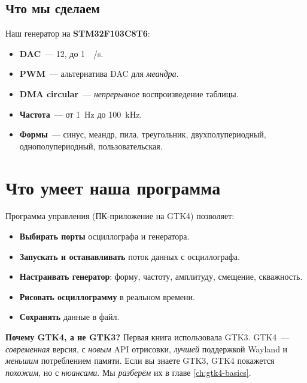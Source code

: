 \subsection{Что мы сделаем}

Наш генератор на \textbf{STM32F103C8T6}:

\begin{itemize}
    \item \textbf{DAC}~--- \SI{12}{\bit}, до \SI{1}{\mega\sample/\second}.
    \item \textbf{PWM}~--- альтернатива DAC для \emph{меандра}.
    \item \textbf{DMA circular}~--- \emph{непрерывное}
          воспроизведение таблицы.
    \item \textbf{Частота}~--- от \SI{1}{\hertz} до \SI{100}{\kilo\hertz}.
    \item \textbf{Формы}~--- синус, меандр, пила, треугольник,
          двухполупериодный, однополупериодный, пользовательская.
\end{itemize}

\section{Что умеет наша программа}
\label{sec:intro-capabilities}

Программа управления (ПК-приложение на GTK4) позволяет:

\begin{itemize}
    \item \textbf{Выбирать порты} осциллографа и генератора.
    \item \textbf{Запускать и останавливать} поток данных
          с осциллографа.
    \item \textbf{Настраивать генератор}: форму, частоту,
          амплитуду, смещение, скважность.
    \item \textbf{Рисовать осциллограмму} в реальном времени.
    \item \textbf{Сохранять} данные в файл.
\end{itemize}

\begin{ideabox}
\textbf{Почему GTK4, а не GTK3?} Первая книга использовала
GTK3. GTK4~--- \emph{современная} версия, с \emph{новым}
API отрисовки, \emph{лучшей} поддержкой Wayland и
\emph{меньшим} потреблением памяти. Если вы знаете GTK3,
GTK4 покажется \emph{похожим}, но с \emph{нюансами}.
Мы \emph{разберём} их в главе \ref{ch:gtk4-basics}.
\end{ideabox}

